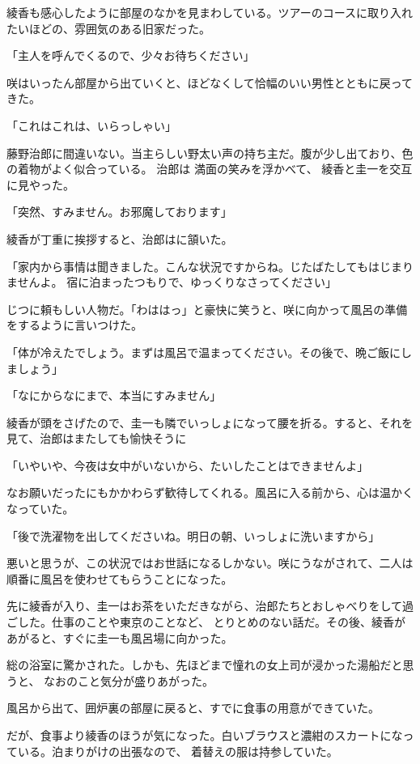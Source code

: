 ﻿\documentclass[
    book,tate,
    line_length=30zw,
    jafontsize=12pt,
    paper=b5j,
    landscape,
    ]{jlreq}
\begin{document}
綾香も感心したように部屋のなかを見まわしている。ツアーのコースに取り入れたいほどの、雰囲気のある旧家だった。

「主人を呼んでくるので、少々お待ちください」

咲はいったん部屋から出ていくと、ほどなくして恰幅のいい男性とともに戻ってきた。

「これはこれは、いらっしゃい」

藤野治郎に間違いない。当主らしい野太い声の持ち主だ。腹が少し出ており、色の着物がよく似合っている。
治郎は 満面の笑みを浮かべて、 綾香と圭一を交互に見やった。

「突然、すみません。お邪魔しております」

綾香が丁重に挨拶すると、治郎はに頷いた。

「家内から事情は聞きました。こんな状況ですからね。じたばたしてもはじまりませんよ。
宿に泊まったつもりで、ゆっくりなさってください」

じつに頼もしい人物だ。「わははっ」と豪快に笑うと、咲に向かって風呂の準備をするように言いつけた。

「体が冷えたでしょう。まずは風呂で温まってください。その後で、晩ご飯にしましょう」

「なにからなにまで、本当にすみません」

綾香が頭をさげたので、圭一も隣でいっしょになって腰を折る。すると、それを見て、治郎はまたしても愉快そうに

「いやいや、今夜は女中がいないから、たいしたことはできませんよ」

なお願いだったにもかかわらず歓待してくれる。風呂に入る前から、心は温かくなっていた。

「後で洗濯物を出してくださいね。明日の朝、いっしょに洗いますから」

悪いと思うが、この状況ではお世話になるしかない。咲にうながされて、二人は順番に風呂を使わせてもらうことになった。

先に綾香が入り、圭一はお茶をいただきながら、治郎たちとおしゃべりをして過ごした。仕事のことや東京のことなど、
とりとめのない話だ。その後、綾香があがると、すぐに圭一も風呂場に向かった。

総の浴室に驚かされた。しかも、先ほどまで憧れの女上司が浸かった湯船だと思うと、
なおのこと気分が盛りあがった。

風呂から出て、囲炉裏の部屋に戻ると、すでに食事の用意ができていた。

だが、食事より綾香のほうが気になった。白いブラウスと濃紺のスカートになっている。泊まりがけの出張なので、
着替えの服は持参していた。
\end{document}
